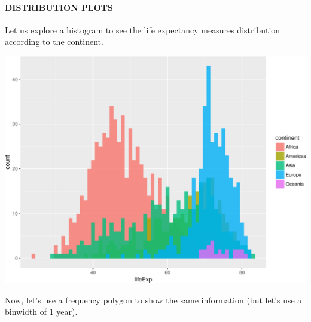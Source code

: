 \documentclass[]{article}
\newenvironment{Shaded}{\begin{snugshade}}{\end{snugshade}}
\newcommand{\KeywordTok}[1]{\textcolor[rgb]{0.13,0.29,0.53}{\textbf{{#1}}}}
\newcommand{\DataTypeTok}[1]{\textcolor[rgb]{0.13,0.29,0.53}{{#1}}}
\newcommand{\DecValTok}[1]{\textcolor[rgb]{0.00,0.00,0.81}{{#1}}}
\newcommand{\FloatTok}[1]{\textcolor[rgb]{0.00,0.00,0.81}{{#1}}}
\newcommand{\StringTok}[1]{\textcolor[rgb]{0.31,0.60,0.02}{{#1}}}
\newcommand{\NormalTok}[1]{{#1}}
\let\oldparagraph\paragraph
\renewcommand{\paragraph}[1]{\oldparagraph{#1}\mbox{}}
\begin{document}
\paragraph{DISTRIBUTION PLOTS}\label{distribution-plots}

Let us explore a histogram to see the life expectancy measures
distribution according to the continent.

\begin{Shaded}
\end{Shaded}

\includegraphics{gapminder-exploration-phase2_files/figure-latex/unnamed-chunk-24-1.pdf}

Now, let's use a frequency polygon to show the same information (but
let's use a binwidth of 1 year).

\begin{Shaded}
\end{Shaded}
\end{document}
